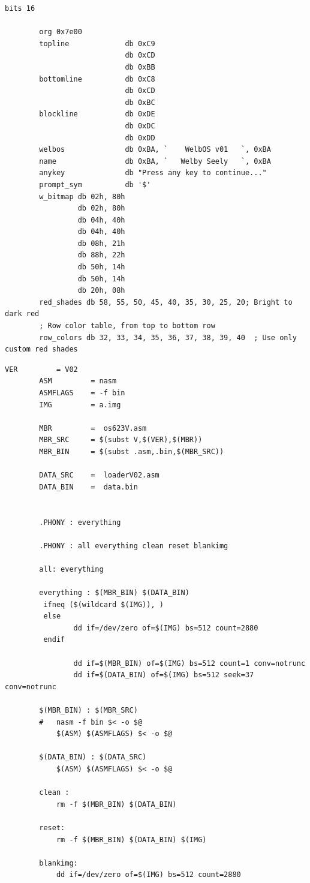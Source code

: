\documentclass{article}
\begin{document}
    \begin{lstlisting}[caption={loaderV02.asm listing}, captionpos=t]
        bits 16

        org 0x7e00
        topline             db 0xC9
                            db 0xCD
                            db 0xBB
        bottomline          db 0xC8
                            db 0xCD
                            db 0xBC
        blockline           db 0xDE
                            db 0xDC
                            db 0xDD
        welbos              db 0xBA, `    WelbOS v01   `, 0xBA
        name                db 0xBA, `   Welby Seely   `, 0xBA
        anykey              db "Press any key to continue..."
        prompt_sym          db '$'
        w_bitmap db 02h, 80h
                 db 02h, 80h
                 db 04h, 40h
                 db 04h, 40h
                 db 08h, 21h
                 db 88h, 22h
                 db 50h, 14h
                 db 50h, 14h
                 db 20h, 08h
        red_shades db 58, 55, 50, 45, 40, 35, 30, 25, 20; Bright to dark red
        ; Row color table, from top to bottom row
        row_colors db 32, 33, 34, 35, 36, 37, 38, 39, 40  ; Use only custom red shades
    \end{lstlisting}

    \begin{lstlisting}[caption={Makefile listing}, captionpos=t]
        VER			= V02
        ASM			= nasm
        ASMFLAGS	= -f bin
        IMG			= a.img

        MBR			=  os623V.asm
        MBR_SRC		= $(subst V,$(VER),$(MBR))
        MBR_BIN		= $(subst .asm,.bin,$(MBR_SRC))

        DATA_SRC	=  loaderV02.asm
        DATA_BIN	=  data.bin


        .PHONY : everything

        .PHONY : all everything clean reset blankimg

        all: everything

        everything : $(MBR_BIN) $(DATA_BIN)
         ifneq ($(wildcard $(IMG)), )
         else
                dd if=/dev/zero of=$(IMG) bs=512 count=2880
         endif

                dd if=$(MBR_BIN) of=$(IMG) bs=512 count=1 conv=notrunc
                dd if=$(DATA_BIN) of=$(IMG) bs=512 seek=37 conv=notrunc

        $(MBR_BIN) : $(MBR_SRC)
        #	nasm -f bin $< -o $@
            $(ASM) $(ASMFLAGS) $< -o $@

        $(DATA_BIN) : $(DATA_SRC)
            $(ASM) $(ASMFLAGS) $< -o $@

        clean :
            rm -f $(MBR_BIN) $(DATA_BIN)

        reset:
            rm -f $(MBR_BIN) $(DATA_BIN) $(IMG)

        blankimg:
            dd if=/dev/zero of=$(IMG) bs=512 count=2880
    \end{lstlisting}
\end{document}
